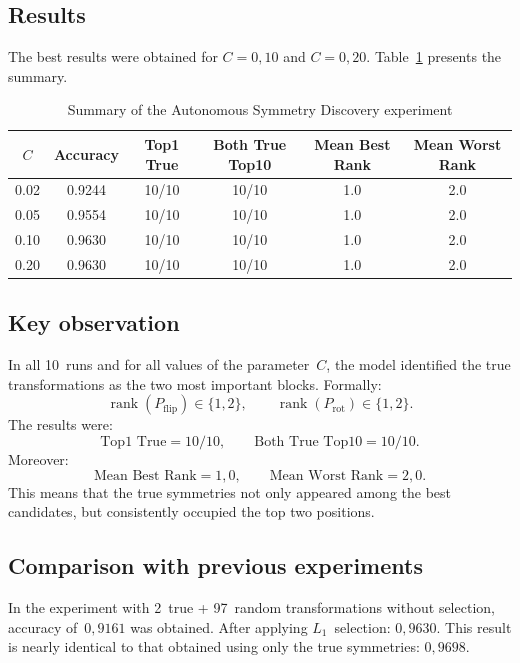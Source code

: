 \documentclass[11pt,a4paper]{report}
\begin{document}
\subsection{Results}

The best results were obtained for $C=0{,}10$ and $C=0{,}20$.
Table~\ref{tab:l1summary} presents the summary.

\begin{table}[H]
\centering
\caption{Summary of the Autonomous Symmetry Discovery experiment}
\label{tab:l1summary}
\begin{tabular}{cccccc}
\toprule
$C$
& Accuracy
& Top1 True
& Both True Top10
& Mean Best Rank
& Mean Worst Rank \\
\midrule
0.02 & 0.9244 & 10/10 & 10/10 & 1.0 & 2.0 \\
0.05 & 0.9554 & 10/10 & 10/10 & 1.0 & 2.0 \\
0.10 & 0.9630 & 10/10 & 10/10 & 1.0 & 2.0 \\
0.20 & 0.9630 & 10/10 & 10/10 & 1.0 & 2.0 \\
\bottomrule
\end{tabular}
\end{table}

\subsection{Key observation}

In all 10~runs and for all values of the parameter~$C$, the model identified the true transformations as the two most important blocks.
Formally:
\[
\operatorname{rank}(P_{\mathrm{flip}})\in\{1,2\},
\qquad
\operatorname{rank}(P_{\mathrm{rot}})\in\{1,2\}.
\]
The results were:
\[
\text{Top1 True}=10/10,
\qquad
\text{Both True Top10}=10/10.
\]
Moreover:
\[
\text{Mean Best Rank}=1{,}0,
\qquad
\text{Mean Worst Rank}=2{,}0.
\]
This means that the true symmetries not only appeared among the best candidates, but consistently occupied the top two positions.

\subsection{Comparison with previous experiments}

In the experiment with 2~true + 97~random transformations without selection, accuracy of~$0{,}9161$ was obtained.
After applying $L_1$~selection: $0{,}9630$.
This result is nearly identical to that obtained using only the true symmetries: $0{,}9698$.
\end{document}

